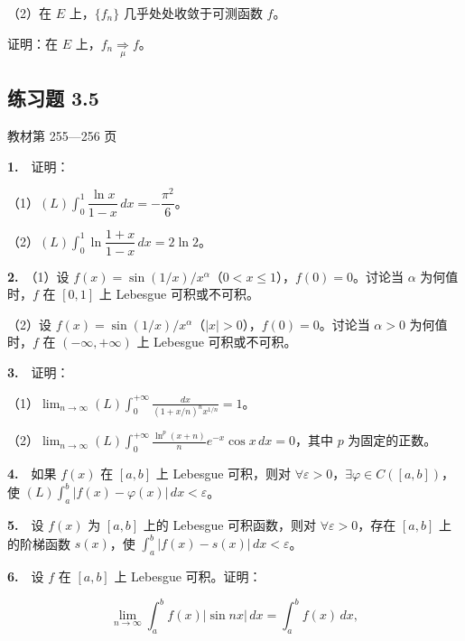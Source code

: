 \documentclass[11pt,a4paper]{article}
\begin{document}
（2）在 \(E\) 上，\(\{f_n\}\) 几乎处处收敛于可测函数 \(f\)。

证明：在 \(E\) 上，\(f_n\underset{\mu}{\Rightarrow} f\)。


\hypertarget{ex5}{}\subsection*{练习题 3.5}
\noindent 教材第 255—256 页

\par{}\noindent \textbf{1.}　证明：

（1）\((L)\int_0^1\dfrac{\ln x}{1-x}\,dx=-\dfrac{\pi^2}{6}\)。

（2）\((L)\int_0^1\ln\dfrac{1+x}{1-x}\,dx=2\ln 2\)。

\par{}\noindent \textbf{2.}　（1）设 \(f(x)=\sin(1/x)/x^\alpha\)（\(0<x\le1\)），\(f(0)=0\)。讨论当 \(\alpha\) 为何值时，\(f\) 在 \([0,1]\) 上 Lebesgue 可积或不可积。

（2）设 \(f(x)=\sin(1/x)/x^\alpha\)（\(|x|>0\)），\(f(0)=0\)。讨论当 \(\alpha>0\) 为何值时，\(f\) 在 \((-\infty,+\infty)\) 上 Lebesgue 可积或不可积。

\par{}\noindent \textbf{3.}　证明：

（1）\(\displaystyle\lim_{n\to\infty}(L)\int_0^{+\infty}\frac{dx}{(1+x/n)^n x^{1/n}}=1\)。

（2）\(\displaystyle\lim_{n\to\infty}(L)\int_0^{+\infty}\frac{\ln^p(x+n)}n e^{-x}\cos x\,dx=0\)，其中 \(p\) 为固定的正数。

\par{}\noindent \textbf{4.}　如果 \(f(x)\) 在 \([a,b]\) 上 Lebesgue 可积，则对 \(\forall\varepsilon>0\)，\(\exists\varphi\in C([a,b])\)，使 \((L)\int_a^b|f(x)-\varphi(x)|\,dx<\varepsilon\)。

\par{}\noindent \textbf{5.}　设 \(f(x)\) 为 \([a,b]\) 上的 Lebesgue 可积函数，则对 \(\forall\varepsilon>0\)，存在 \([a,b]\) 上的阶梯函数 \(s(x)\)，使 \(\int_a^b|f(x)-s(x)|\,dx<\varepsilon\)。

\par{}\noindent \textbf{6.}　设 \(f\) 在 \([a,b]\) 上 Lebesgue 可积。证明：

\[
\lim_{n\to\infty}\int_a^b f(x)|\sin nx|\,dx=\int_a^b f(x)\,dx,
\]
\end{document}
